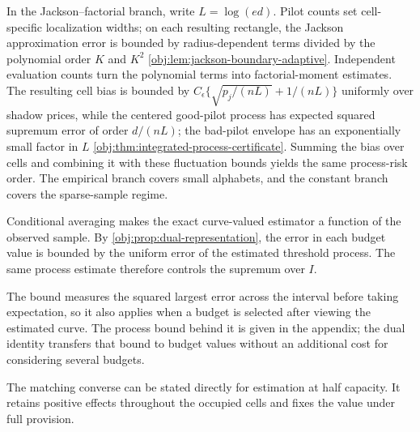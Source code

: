 In the Jackson--factorial branch, write \(L=\log(ed)\). Pilot counts set cell-specific localization widths; on each resulting rectangle, the Jackson approximation error is bounded by radius-dependent terms divided by the polynomial order \(K\) and \(K^2\) \cref{obj:lem:jackson-boundary-adaptive}. Independent evaluation counts turn the polynomial terms into factorial-moment estimates. The resulting cell bias is bounded by \(C_\epsilon\{\sqrt{p_j/(nL)}+1/(nL)\}\) uniformly over shadow prices, while the centered good-pilot process has expected squared supremum error of order \(d/(nL)\); the bad-pilot envelope has an exponentially small factor in \(L\) \cref{obj:thm:integrated-process-certificate}. Summing the bias over cells and combining it with these fluctuation bounds yields the same process-risk order. The empirical branch covers small alphabets, and the constant branch covers the sparse-sample regime.



Conditional averaging makes the exact curve-valued estimator a function of the observed sample. By \cref{obj:prop:dual-representation}, the error in each budget value is bounded by the uniform error of the estimated threshold process. The same process estimate therefore controls the supremum over \(I\).



The bound measures the squared largest error across the interval before taking expectation, so it also applies when a budget is selected after viewing the estimated curve. The process bound behind it is given in the appendix; the dual identity transfers that bound to budget values without an additional cost for considering several budgets.

The matching converse can be stated directly for estimation at half capacity. It retains positive effects throughout the occupied cells and fixes the value under full provision.

